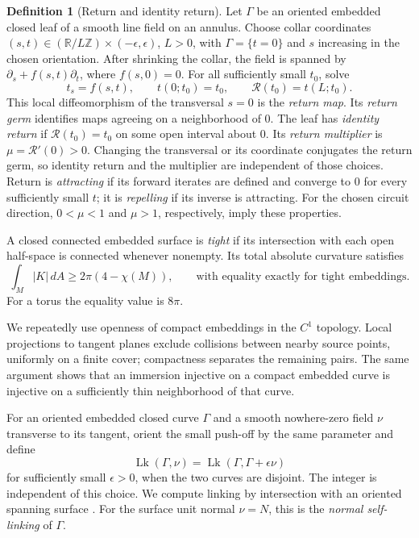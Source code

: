 \documentclass[11pt]{amsart}
\theoremstyle{definition}
\newtheorem{definition}[theorem]{Definition}
\theoremstyle{remark}
\newcommand{\R}{\mathbb R}\newcommand{\Sph}{\mathbb S}
\DeclareMathOperator{\Lk}{Lk}
\numberwithin{equation}{section}
\begin{document}
\begin{definition}[Return and identity return]\label{def:return}
Let $\Gamma$ be an oriented embedded closed leaf of a smooth line field
on an annulus. Choose collar coordinates
$(s,t)\in(\R/L\mathbb Z)\times(-\epsilon,\epsilon)$, $L>0$, with
$\Gamma=\{t=0\}$ and $s$ increasing in the chosen orientation.
After shrinking the collar, the field is spanned by
$\partial_s+f(s,t)\partial_t$, where $f(s,0)=0$.
For all sufficiently small $t_0$, solve
\[
 t_s=f(s,t),\qquad t(0;t_0)=t_0,
 \qquad \mathcal R(t_0)=t(L;t_0).
\]
This local diffeomorphism of the transversal $s=0$ is the \emph{return
map}. Its \emph{return germ} identifies maps agreeing on a neighborhood
of $0$. The leaf has \emph{identity return} if
$\mathcal R(t_0)=t_0$ on some open interval about $0$.
Its \emph{return multiplier} is $\mu=\mathcal R'(0)>0$.
Changing the transversal or its coordinate conjugates the return germ,
so identity return and the multiplier are independent of those choices.
Return is \emph{attracting} if its forward iterates are defined and
converge to $0$ for every sufficiently small $t$; it is \emph{repelling}
if its inverse is attracting. For the chosen circuit direction,
$0<\mu<1$ and $\mu>1$, respectively, imply these properties.
\end{definition}

A closed connected embedded surface is \emph{tight} if its intersection
with each open half-space is connected whenever nonempty. Its total
absolute curvature satisfies \cite[\S1.1]{BK}
\begin{equation}\label{eq:tight-bound}
 \int_M|K|\,dA\ge2\pi(4-\chi(M)),
 \qquad\text{with equality exactly for tight embeddings}.
\end{equation}
For a torus the equality value is $8\pi$.

We repeatedly use openness of compact embeddings in the $C^1$ topology.
Local projections to tangent planes exclude collisions between nearby
source points, uniformly on a finite cover; compactness separates the
remaining pairs. The same argument shows that an immersion injective on
a compact embedded curve is injective on a sufficiently thin neighborhood
of that curve.

For an oriented embedded closed curve $\Gamma$ and a smooth nowhere-zero
field $\nu$ transverse to its tangent, orient the small push-off by the
same parameter and define
\[
 \Lk(\Gamma,\nu)=\Lk(\Gamma,\Gamma+\epsilon\nu)
\]
for sufficiently small $\epsilon>0$, when the two curves are disjoint.
The integer is independent of this choice. We compute linking by intersection with an
oriented spanning surface \cite{Rolfsen}.
For the surface unit normal $\nu=N$, this is the \emph{normal self-linking}
of $\Gamma$.
\end{document}
